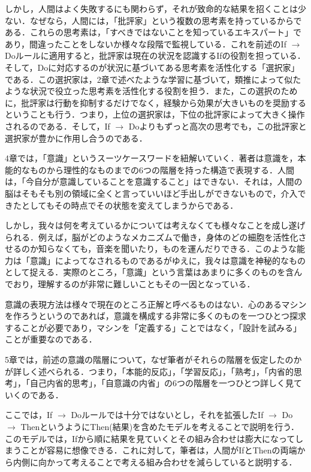 \documentclass{jarticle}
\begin{document}
しかし，人間はよく失敗するにも関わらず，それが致命的な結果を招くことは少ない．なぜなら，人間には，「批評家」という複数の思考素を持っているからである．これらの思考素は，「すべきではないことを知っているエキスパート」であり，間違ったことをしないか様々な段階で監視している．これを前述のIf $\to$ Doルールに適用すると，批評家は現在の状況を認識するIfの役割を担っている．そして，Doに対応するのが状況に基づいてある思考素を活性化する「選択家」である．この選択家は，2章で述べたような学習に基づいて，類推によって似たような状況で役立った思考素を活性化する役割を担う．また，この選択のために，批評家は行動を抑制するだけでなく，経験から効果が大きいものを奨励するということも行う．つまり，上位の選択家は，下位の批評家によって大きく操作されるのである．そして，If $\to$ Doよりもずっと高次の思考でも，この批評家と選択家が豊かに作用し合うのである．





4章では，「意識」というスーツケースワードを紐解いていく．著者は意識を，本能的なものから理性的なものまでの6つの階層を持った構造で表現する．人間は，「今自分が意識していることを意識すること」はできない．それは，人間の脳はそもそも別の領域に全くと言っていいほど手出しができないもので，介入できたとしてもその時点でその状態を変えてしまうからである．

しかし，我々は何を考えているかについては考えなくても様々なことを成し遂げられる．例えば，脳がどのようなメカニズムで働き，身体のどの細胞を活性化させるのか知らなくても，音楽を聞いたり，ものを運んだりできる．このような能力は「意識」によってなされるものであるがゆえに，我々は意識を神秘的なものとして捉える．実際のところ，「意識」という言葉はあまりに多くのものを含んでおり，理解するのが非常に難しいこともその一因となっている．

意識の表現方法は様々で現在のところ正解と呼べるものはない．心のあるマシンを作ろうというのであれば，意識を構成する非常に多くのものを一つひとつ探求することが必要であり，マシンを「定義する」ことではなく，「設計を試みる」ことが重要なのである．





5章では，前述の意識の階層について，なぜ筆者がそれらの階層を仮定したのかが詳しく述べられる．つまり，「本能的反応」，「学習反応」，「熟考」，「内省的思考」，「自己内省的思考」，「自意識の内省」の6つの階層を一つひとつ詳しく見ていくのである．

ここでは，If $\to$ Doルールでは十分ではないとし，それを拡張したIf $\to$ Do $\to$ ThenというようにThen(結果)を含めたモデルを考えることで説明を行う．このモデルでは，Ifから順に結果を見ていくとその組み合わせは膨大になってしまうことが容易に想像できる．これに対して，筆者は，人間がIfとThenの両端から内側に向かって考えることで考える組み合わせを減らしていると説明する．
\end{document}

